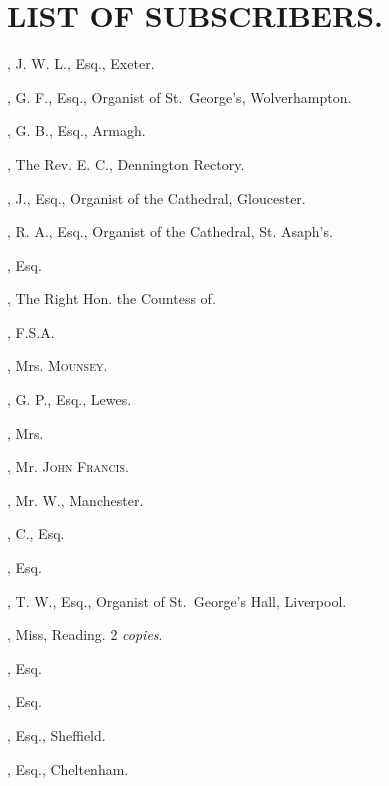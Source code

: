 \renewcommand\versoheader{list of subscribers.}
\renewcommand\rectoheader{list of subscribers.}


\chapter{LIST OF SUBSCRIBERS.}
\thispagestyle{empty}
\setcounter{page}{17}

\setlength{\columnseprule}{0.4pt}
\begin{multicols}{2}\small
\raggedright
{}, J. W. L., Esq., Exeter.

, G. F., Esq., Organist of St.~George’s, Wolverhampton.

, G. B., Esq., Armagh.

, The Rev. E. C., Dennington
Rectory.

, J., Esq., Organist of the Cathedral,
Gloucester.

, R. A., Esq., Organist of the
Cathedral, St. Asaph’s.

, Esq.

, The Right Hon. the
Countess of.

, F.S.A.
\bigskip

, Mrs. \textsc{Mounsey}.

, G. P., Esq., Lewes.

, Mrs.

, Mr. \textsc{John Francis}.

, Mr. W., Manchester.

, C., Esq.

, Esq.

, T. W., Esq., Organist of St.~George’s
Hall, Liverpool.

, Miss, Reading. 2 \textit{copies}.

, Esq.

, Esq.

, Esq., Sheffield.

, Esq., Cheltenham.


\end{multicols}
